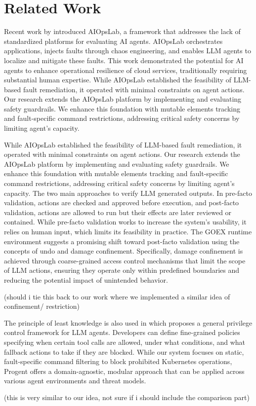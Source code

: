\section{Related Work}
\label{sec:related_work}

Recent work by \cite{shetty2024aiagents} introduced AIOpsLab, a framework that addresses the lack of standardized platforms for evaluating AI agents. AIOpsLab orchestrates applications, injects faults through chaos engineering, and enables LLM agents to localize and mitigate these faults. This work demonstrated the potential for AI agents to enhance operational resilience of cloud services, traditionally requiring substantial human expertise. 
While AIOpsLab established the feasibility of LLM-based fault remediation, it operated with minimal constraints on agent actions. Our research extends the AIOpsLab platform by implementing and evaluating safety guardrails. We enhance this foundation with mutable elements tracking and fault-specific command restrictions, addressing critical safety concerns by limiting agent’s capacity. 

While AIOpsLab established the feasibility of LLM-based fault remediation, it operated with minimal constraints on agent actions. Our research extends the AIOpsLab platform by implementing and evaluating safety guardrails. We enhance this foundation with mutable elements tracking and fault-specific command restrictions, addressing critical safety concerns by limiting agent’s capacity. 
The two main approaches to verify LLM generated outputs. In pre-facto validation, actions are checked and approved before execution, and post-facto validation, actions are allowed to run but their effects are later reviewed or contained.
While pre-facto validation works to increase the system’s usability, it relies on human input, which limits its feasibility in practice. The GOEX runtime environment \cite{patil2024goexperspectivesdesignsruntime} suggests a promising shift toward post-facto validation using the concepts of undo and damage confinement. Specifically, damage confinement is achieved through coarse-grained access control mechanisms that limit the scope of LLM actions, ensuring they operate only within predefined boundaries and reducing the potential impact of unintended behavior.

(should i tie this back to our work where we implemented a similar idea of confinement/ restriction)


The principle of least knowledge is also used in \cite{shi2025progent} which proposes a general privilege control framework for LLM agents. Developers can define fine-grained policies specifying when certain tool calls are allowed, under what conditions, and what fallback actions to take if they are blocked. While our system focuses on static, fault-specific command filtering to block prohibited Kubernetes operations, Progent offers a domain-agnostic, modular approach that can be applied across various agent environments and threat models.

(this is very similar to our idea, not sure if i should include the comparison part)
